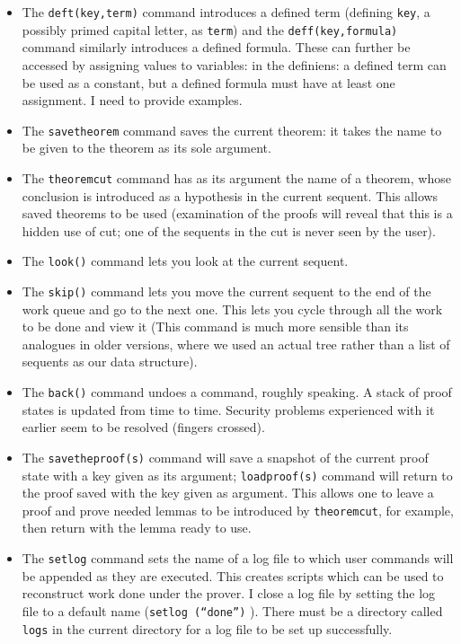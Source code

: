 \documentclass{article}
\begin{document}
\begin{itemize}
\item  The {\tt deft(key,term)} command introduces a defined term (defining {\tt key}, a possibly primed capital letter, as {\tt term}) and the {\tt deff(key,formula)} command similarly introduces a defined formula.  These can further be accessed by assigning values to variables: 
in the definiens:  a defined term can be used as a constant, but a defined formula must have at least one assignment.  I need to provide examples.

\item The {\tt savetheorem} command saves the current theorem:  it takes the name to be given to the theorem as its sole argument.

\item  The {\tt theoremcut} command has as its argument the name of a theorem, whose conclusion is introduced as a hypothesis in the current sequent.  This allows saved theorems to be used (examination of the proofs will reveal that this is a hidden use of cut;  one of the sequents in the cut is never seen by the user).

\item The {\tt look()} command lets you look at the current sequent.

\item The {\tt skip()} command lets you move the current sequent to the end of the work queue and go to the next one.  This lets you cycle through all the work to be done and view it (This command is much more sensible than its analogues in older versions, where we used
an actual tree rather than a list of sequents as our data structure).

\item The {\tt back()} command undoes a command, roughly speaking.  A stack of proof states is updated from time to time.  Security problems experienced with it earlier seem to be resolved (fingers crossed).

\item The {\tt savetheproof(s)} command will save a snapshot of the current proof state with a key given as its argument;
{\tt loadproof(s)} command will return to the proof saved with the key given as argument.   This allows one to leave a proof
and prove needed lemmas to be introduced by {\tt theoremcut}, for example, then return with the lemma ready to use.

\item  The {\tt setlog} command sets the name of a log file to which user commands will be appended as they are executed.
This creates scripts which can be used to reconstruct work done under the prover.  I close a log file by setting the log file to a default name ({\tt setlog (``done'')} ).  There must be a directory called {\tt logs} in the current directory for a log file to be set up successfully.


\end{itemize}
\end{document}
